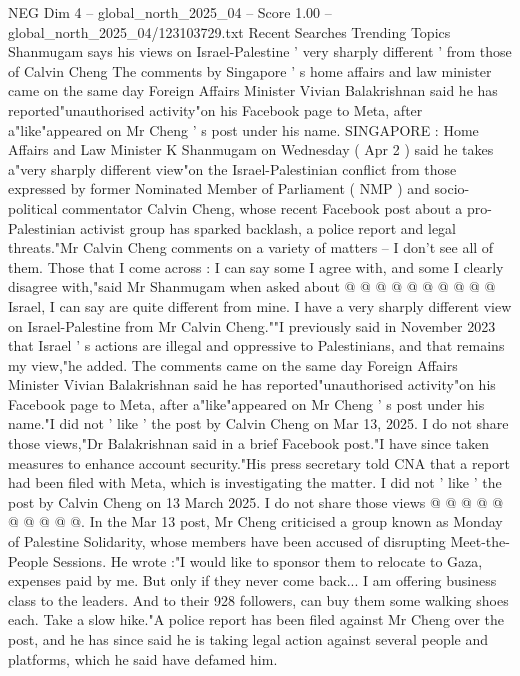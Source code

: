 \begin{textsample}{NEG Dim 4 – global\_north\_2025\_04 – Score 1.00 – global\_north\_2025\_04/123103729.txt}  \label{ex:f4_neg_249}
Recent Searches Trending Topics Shanmugam says his views on Israel-Palestine ' very sharply different ' from those of Calvin Cheng The comments by Singapore ' s home affairs and law minister came on the same day Foreign Affairs Minister Vivian Balakrishnan said he has reported"unauthorised activity"on his Facebook page to Meta, after a"like"appeared on Mr Cheng ' s post under his name.
SINGAPORE : Home Affairs and Law Minister K Shanmugam on Wednesday ( Apr 2 ) said he takes a"very sharply different view"on the Israel-Palestinian conflict from those expressed by former Nominated Member of Parliament ( NMP ) and socio-political commentator Calvin Cheng, whose recent Facebook post about a pro-Palestinian activist group has sparked backlash, a police report and legal threats."Mr Calvin Cheng comments on a variety of matters -- I don't see all of them.
Those that I come across : I can say some I agree with, and some I clearly disagree with,"said Mr Shanmugam when asked about @ @ @ @ @ @ @ @ @ @ Israel, I can say are quite different from mine.
I have a very sharply different view on Israel-Palestine from Mr Calvin Cheng.""I previously said in November 2023 that Israel ' s actions are illegal and oppressive to Palestinians, and that remains my view,"he added.
The comments came on the same day Foreign Affairs Minister Vivian Balakrishnan said he has reported"unauthorised activity"on his Facebook page to Meta, after a"like"appeared on Mr Cheng ' s post under his name."I did not ' like ' the post by Calvin Cheng on Mar 13, 2025.
I do not share those views,"Dr Balakrishnan said in a brief Facebook post."I have since taken measures to enhance account security."His press secretary told CNA that a report had been filed with Meta, which is investigating the matter.
I did not ' like ' the post by Calvin Cheng on 13 March 2025.
I do not share those views @ @ @ @ @ @ @ @ @ @.
In the Mar 13 post, Mr Cheng criticised a group known as Monday of Palestine Solidarity, whose members have been accused of disrupting Meet-the-People Sessions.
He wrote :"I would like to sponsor them to relocate to Gaza, expenses paid by me.
But only if they never come back...
I am offering business class to the leaders.
And to their 928 followers, can buy them some walking shoes each.
Take a slow hike."A police report has been filed against Mr Cheng over the post, and he has since said he is taking legal action against several people and platforms, which he said have defamed him.

\end{textsample}
